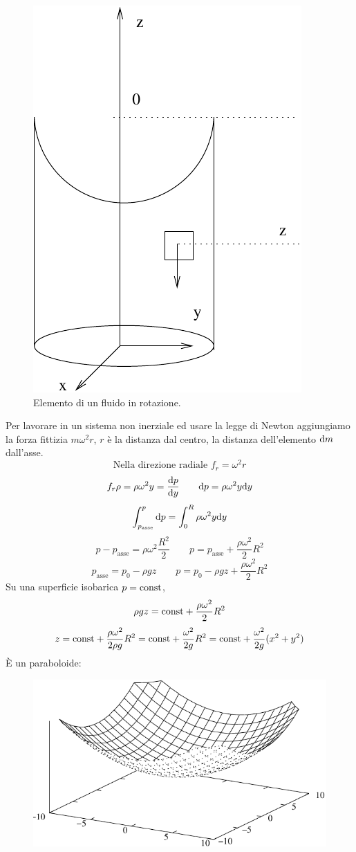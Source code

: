 \begin{Es}
   \begin{figure}[htbp]
      \centering
      \includegraphics[scale=0.65]{immagini/fisica1/fluido_rotazione}
      \caption{Elemento di un fluido in rotazione.}
   \end{figure}
   Per lavorare in un sistema non inerziale ed usare la legge di Newton aggiungiamo la forza fittizia $m\omega^2 r$, $r$ è la distanza dal centro, la distanza dell'elemento $\mathrm{d} m$ dall'asse.
   \[\text{Nella direzione radiale } f_r=\omega^2 r\]
   \[f_r\rho=\rho\omega^2 y=\frac{\mathrm{d} p}{\mathrm{d} y}\qquad \mathrm{d} p=\rho\omega^2 y\mathrm{d} y\]
   \[\int_{p_\text{asse}}^p\mathrm{d} p=\int_0^R \rho\omega^2 y\mathrm{d} y\]
   \[p-p_\text{asse}=\rho\omega^2\frac{R^2}{2}\qquad p=p_\text{asse}+\frac{\rho\omega^2}{2}R^2\]
   \[p_\text{asse}=p_0-\rho gz\qquad p=p_0-\rho gz+\frac{\rho\omega^2}{2}R^2\]
   Su una superficie isobarica $p=\text{const}$,
   \[\rho gz=\text{const}+\frac{\rho\omega^2}{2}R^2\]
   \[z=\text{const}+\frac{\rho\omega^2}{2\rho g}R^2=\text{const}+\frac{\omega^2}{2g}R^2=\text{const}+\frac{\omega^2}{2g}(x^2+y^2)\]
   \`E un paraboloide:
   \begin{figure}[htbp]
      \centering
      \includegraphics[scale=1]{immagini/fisica1/paraboloide}

\end{figure}
\end{Es}

